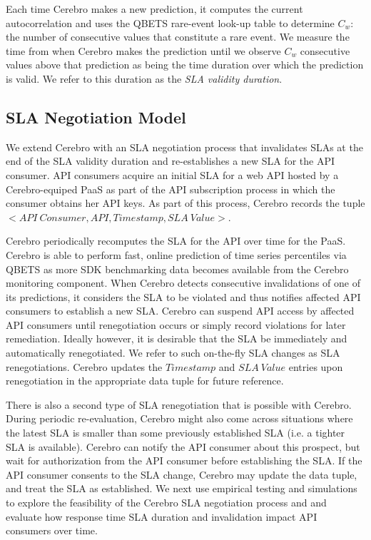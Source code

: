 Each time Cerebro makes a new prediction, it computes the current
autocorrelation and uses the QBETS rare-event look-up table to determine $C_{w}$:
the number of consecutive values that constitute a rare event.
We measure the time from when
Cerebro makes the prediction until we observe $C_{w}$ 
consecutive values above that prediction 
as being the time duration over which
the prediction is valid. 
We refer to this duration as the \textit{SLA validity duration}.  


\vspace{-0.1in}
\subsection{ SLA Negotiation Model}
\vspace{-0.1in}
We extend Cerebro with an SLA negotiation process that invalidates SLAs at the end of the
SLA validity duration and re-establishes a new SLA for the API consumer.
API consumers acquire an initial SLA for a web API hosted by a Cerebro-equiped PaaS
as part of the API subscription process in which the consumer obtains her API keys.
As part of this process, Cerebro records the 
tuple $<API\ Consumer, API, Timestamp, SLA\ Value>$.

Cerebro periodically recomputes the SLA for the API over time for the PaaS. 
Cerebro is able to perform fast, online
prediction of time series percentiles via QBETS as more SDK benchmarking data becomes 
available from the Cerebro monitoring component.
When Cerebro detects consecutive invalidations of one of its predictions,
it considers the SLA to be violated and thus notifies affected API consumers to establish a 
new SLA.  Cerebro can suspend API access by affected API consumers until 
renegotiation occurs or simply record violations for later remediation.
Ideally however, it is desirable that the SLA be immediately and automatically 
renegotiated.  We refer to such on-the-fly
SLA changes as SLA renegotiations. 
Cerebro updates the $Timestamp$ and $SLA\ Value$ entries upon renegotiation 
in the appropriate data tuple for future reference.

There is also a second type of SLA renegotiation that is possible with Cerebro.
During periodic re-evaluation, Cerebro might also come across situations where the latest SLA is smaller
than some previously established SLA (i.e. a tighter SLA is available). Cerebro can notify the 
API consumer about this prospect, but wait for authorization from the API consumer before 
establishing the SLA. If the API consumer consents to the SLA change, Cerebro may update the
data tuple, and treat the SLA as established.
We next use empirical testing and simulations to explore 
the feasibility of the Cerebro SLA negotiation process and 
and evaluate how response time SLA duration and invalidation impact API consumers over time.

